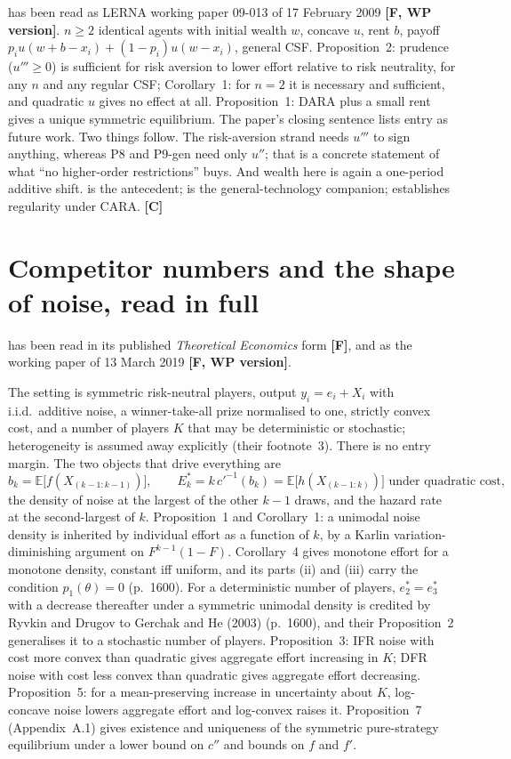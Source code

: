 \documentclass[11pt,a4paper]{article}
\begin{document}
\citet{Treich2010} has been read as LERNA working paper 09-013 of 17 February
2009 \textbf{[F, WP version]}. $n \geq 2$ identical agents with initial wealth
$w$, concave $u$, rent $b$, payoff $p_i u(w + b - x_i) + (1-p_i) u(w - x_i)$,
general CSF. Proposition~2: prudence ($u''' \geq 0$) is sufficient for risk
aversion to lower effort relative to risk neutrality, for any $n$ and any
regular CSF; Corollary~1: for $n = 2$ it is necessary and sufficient, and
quadratic $u$ gives no effect at all. Proposition~1: DARA plus a small rent
gives a unique symmetric equilibrium. The paper's closing sentence lists entry
as future work. Two things follow. The risk-aversion strand needs $u'''$ to
sign anything, whereas P8 and P9-gen need only $u''$; that is a concrete
statement of what ``no higher-order restrictions'' buys. And wealth here is
again a one-period additive shift. \citet{SkaperdasGan1995} is the antecedent;
\citet{CornesHartley2005} is the general-technology companion;
\citet{CornesHartley2003} establishes regularity under CARA. \textbf{[C]}

\section{Competitor numbers and the shape of noise, read in full}

\citet{RyvkinDrugov2020} has been read in its published \emph{Theoretical
Economics} form \textbf{[F]}, and \citet{DrugovRyvkin2020} as the working
paper of 13 March 2019 \textbf{[F, WP version]}.

The setting is symmetric risk-neutral players, output $y_i = e_i + X_i$ with
i.i.d.\ additive noise, a winner-take-all prize normalised to one, strictly
convex cost, and a number of players $K$ that may be deterministic or
stochastic; heterogeneity is assumed away explicitly (their footnote~3). There
is no entry margin. The two objects that drive everything are
\[
  b_k = \mathbb{E}\big[f(X_{(k-1:k-1)})\big], \qquad
  E^*_k = k\,c'^{-1}(b_k) = \mathbb{E}\big[h(X_{(k-1:k)})\big]
  \text{ under quadratic cost},
\]
the density of noise at the largest of the other $k-1$ draws, and the hazard
rate at the second-largest of $k$. Proposition~1 and Corollary~1: a unimodal
noise density is inherited by individual effort as a function of $k$, by a
Karlin variation-diminishing argument on $F^{k-1}(1-F)$. Corollary~4 gives
monotone effort for a monotone density, constant iff uniform, and its parts
(ii) and (iii) carry the condition $p_1(\theta) = 0$ (p.~1600). For a
deterministic number of players, $e^*_2 = e^*_3$ with a decrease thereafter
under a symmetric unimodal density is credited by Ryvkin and Drugov to Gerchak
and He (2003) (p.~1600), and their Proposition~2 generalises it to a
stochastic number of players.
Proposition~3: IFR noise with cost more convex than quadratic gives aggregate
effort increasing in $K$; DFR noise with cost less convex than quadratic gives
aggregate effort decreasing. Proposition~5: for a mean-preserving increase in
uncertainty about $K$, log-concave noise lowers aggregate effort and log-convex
raises it. Proposition~7 (Appendix~A.1) gives existence and uniqueness of the
symmetric pure-strategy equilibrium under a lower bound on $c''$ and bounds on
$f$ and $f'$.
\end{document}
